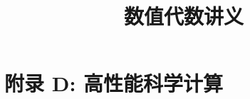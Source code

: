 \documentclass{book}
\begin{document}
\title{数值代数讲义}
\maketitle
\chapter{附录 D: 高性能科学计算}
\cite{stein2003}


\end{document}
